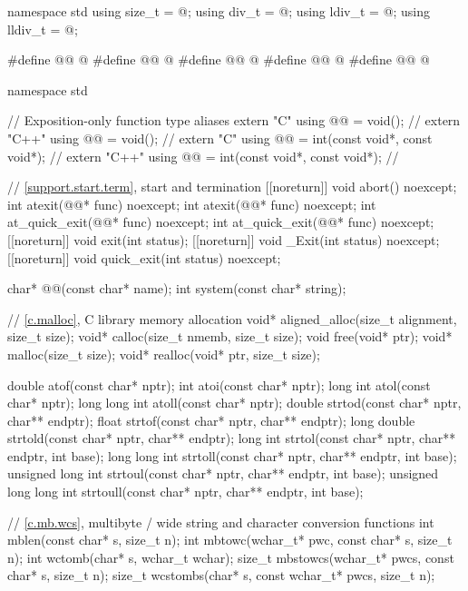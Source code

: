 \begin{codeblock}
namespace std {
  using size_t = @\seebelow@;
  using div_t = @\seebelow@;
  using ldiv_t = @\seebelow@;
  using lldiv_t = @\seebelow@;
}

#define @@ @\seebelow@
#define @@ @\seebelow@
#define @@ @\seebelow@
#define @@ @\seebelow@
#define @@ @\seebelow@

namespace std {
  // Exposition-only function type aliases
  extern "C" using @@ = void();                        // \expos
  extern "C++" using @@ = void();                        // \expos
  extern "C" using @@ = int(const void*, const void*);   // \expos
  extern "C++" using @@ = int(const void*, const void*);   // \expos

  // \ref{support.start.term}, start and termination
  [[noreturn]] void abort() noexcept;
  int atexit(@@* func) noexcept;
  int atexit(@@* func) noexcept;
  int at_quick_exit(@@* func) noexcept;
  int at_quick_exit(@@* func) noexcept;
  [[noreturn]] void exit(int status);
  [[noreturn]] void _Exit(int status) noexcept;
  [[noreturn]] void quick_exit(int status) noexcept;

  char* @@(const char* name);
  int system(const char* string);

  // \ref{c.malloc}, C library memory allocation
  void* aligned_alloc(size_t alignment, size_t size);
  void* calloc(size_t nmemb, size_t size);
  void free(void* ptr);
  void* malloc(size_t size);
  void* realloc(void* ptr, size_t size);

  double atof(const char* nptr);
  int atoi(const char* nptr);
  long int atol(const char* nptr);
  long long int atoll(const char* nptr);
  double strtod(const char* nptr, char** endptr);
  float strtof(const char* nptr, char** endptr);
  long double strtold(const char* nptr, char** endptr);
  long int strtol(const char* nptr, char** endptr, int base);
  long long int strtoll(const char* nptr, char** endptr, int base);
  unsigned long int strtoul(const char* nptr, char** endptr, int base);
  unsigned long long int strtoull(const char* nptr, char** endptr, int base);

  // \ref{c.mb.wcs}, multibyte / wide string and character conversion functions
  int mblen(const char* s, size_t n);
  int mbtowc(wchar_t* pwc, const char* s, size_t n);
  int wctomb(char* s, wchar_t wchar);
  size_t mbstowcs(wchar_t* pwcs, const char* s, size_t n);
  size_t wcstombs(char* s, const wchar_t* pwcs, size_t n);

}
\end{codeblock}
